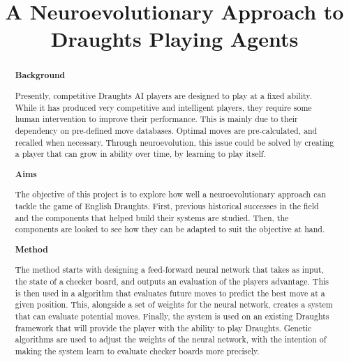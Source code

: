 \documentclass[12pt,a4paper]{article}
\title{A Neuroevolutionary Approach to Draughts Playing Agents}
\author{}
\date{}
\begin{document}
    \maketitle


\begin{abstract}


    {\bf Background}

    Presently, competitive Draughts AI players are designed to play at a fixed ability. While it has produced very competitive and intelligent players, they require some human intervention to improve their performance. 
    This is mainly due to their dependency on pre-defined move databases. Optimal moves are pre-calculated, and recalled when necessary. Through neuroevolution, this issue could be solved by creating a player that can grow in ability over time, by learning to play itself.
    
    {\bf Aims}

    The objective of this project is to explore how well a neuroevolutionary approach can tackle the game of English Draughts. First, previous historical successes in the field and the components that helped build their systems are studied. Then, the components are looked to see how they can be adapted to suit the objective at hand. 

    {\bf Method}

    The method starts with designing a feed-forward neural network that takes as input, the state of a checker board, and outputs an evaluation of the players advantage. This is then used in a algorithm that evaluates future moves to predict the best move at a given position. This, alongside a set of weights for the neural network, creates a system that can evaluate potential moves. Finally, the system is used on an existing Draughts framework that will provide the player with the ability to play Draughts. Genetic algorithms are used to adjust the weights of the neural network, with the intention of making the system learn to evaluate checker boards more precisely. 
    

\end{abstract}
\end{document}
